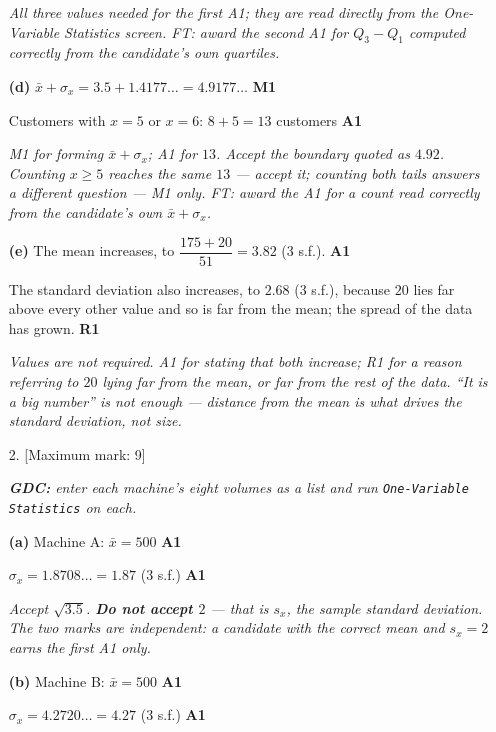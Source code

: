 \documentclass[12pt, twoside]{article}
\begin{document}
\begin{enumerate}[itemsep=0.3cm]
\emph{All three values needed for the first A1; they are read directly from
the One-Variable Statistics screen. FT: award the second A1 for
$Q_{3} - Q_{1}$ computed correctly from the candidate's own quartiles.}

\textbf{(d)} $\bar{x} + \sigma_{x} = 3.5 + 1.4177\ldots = 4.9177\ldots$
\hfill \textbf{M1}

Customers with $x = 5$ or $x = 6$: \quad $8 + 5 = 13$ customers
\hfill \textbf{A1}

\emph{M1 for forming $\bar{x} + \sigma_{x}$; A1 for $13$. Accept the boundary
quoted as $4.92$. Counting $x \geq 5$ reaches the same $13$ --- accept it;
counting both tails answers a different question --- M1 only. FT: award the A1
for a count read correctly from the candidate's own $\bar{x} + \sigma_{x}$.}

\textbf{(e)} The mean increases, to
$\dfrac{175 + 20}{51} = 3.82$ (3 s.f.). \hfill \textbf{A1}

The standard deviation also increases, to $2.68$ (3 s.f.), because $20$ lies
far above every other value and so is far from the mean; the spread of the
data has grown. \hfill \textbf{R1}

\emph{Values are not required. A1 for stating that both increase; R1 for a
reason referring to $20$ lying far from the mean, or far from the rest of the
data. ``It is a big number'' is not enough --- distance from the mean is what
drives the standard deviation, not size.}

\newpage

\item[2.] [Maximum mark: 9]

\emph{\textbf{GDC:} enter each machine's eight volumes as a list and run
\texttt{One-Variable Statistics} on each.}

\textbf{(a)} Machine A: \quad $\bar{x} = 500$ \hfill \textbf{A1}

$\sigma_{x} = 1.8708\ldots = 1.87$ (3 s.f.) \hfill \textbf{A1}

\emph{Accept $\sqrt{3.5}$. \textbf{Do not accept $2$} --- that is $s_{x}$, the
sample standard deviation. The two marks are independent: a candidate with
the correct mean and $s_{x} = 2$ earns the first A1 only.}

\textbf{(b)} Machine B: \quad $\bar{x} = 500$ \hfill \textbf{A1}

$\sigma_{x} = 4.2720\ldots = 4.27$ (3 s.f.) \hfill \textbf{A1}


\end{enumerate}
\end{document}
